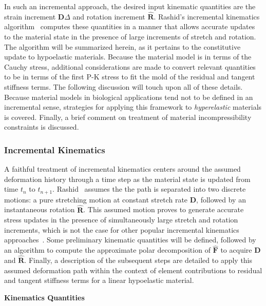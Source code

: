 In such an incremental approach, the desired input kinematic quantities are the strain increment $\bm{D}\Delta$ and rotation increment $\hat{\bm{R}}$. Rashid's incremental kinematics algorithm~\cite{rashid_1993} computes these quantities in a manner that allows accurate updates to the material state in the presence of large increments of stretch and rotation. The algorithm will be summarized herein, as it pertains to the constitutive update to hypoelastic materials. Because the material model is in terms of the Cauchy stress, additional considerations are made to convert relevant quantities to be in terms of the first P-K stress to fit the mold of the residual and tangent stiffness terms. The following discussion will touch upon all of these details. Because material models in biological applications tend not to be defined in an incremental sense, strategies for applying this framework to \textit{hyperelastic} materials is covered. Finally, a brief comment on treatment of material incompressibility constraints is discussed.

\subsubsection{Incremental Kinematics}

A faithful treatment of incremental kinematics centers around the assumed deformation history through a time step as the material state is updated from time $t_n$ to $t_{n+1}$. Rashid~\cite{rashid_1993} assumes the the path is separated into two discrete motions: a pure stretching motion at constant stretch rate $\bm{D}$, followed by an instantaneous rotation $\hat{\bm{R}}$. This assumed motion proves to generate accurate stress updates in the presence of simultaneously large stretch and rotation increments, which is not the case for other popular incremental kinematics approaches~\cite{rashid_1996}. Some preliminary kinematic quantities will be defined, followed by an algorithm to compute the approximate polar decomposition of $\hat{\bm{F}}$ to acquire $\bm{D}$ and $\hat{\bm{R}}$. Finally, a description of the subsequent steps are detailed to apply this assumed deformation path within the context of element contributions to residual and tangent stiffness terms for a linear hypoelastic material.

\textbf{Kinematics Quantities}

